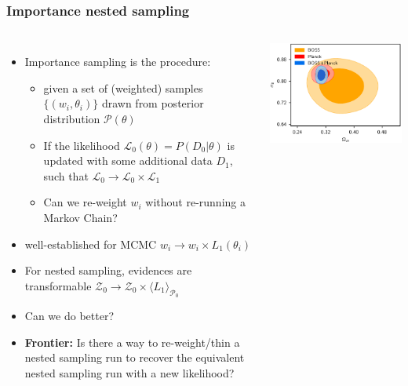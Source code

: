 \documentclass[aspectratio=169,handout]{beamer}
\begin{document}
\begin{frame}
    \frametitle{Importance nested sampling}
    \begin{columns}
    \begin{itemize}
        \item Importance sampling is the procedure:
            \begin{itemize}
                \item given a set of (weighted) samples $\{(w_i,\theta_i)\}$ drawn from posterior distribution $\mathcal{P}(\theta)$
                \item If the likelihood $\mathcal{L}_0(\theta)=P(D_0|\theta)$ is updated with some additional data $D_1$, such that $\mathcal{L}_0 \to \mathcal{L}_0\times \mathcal{L}_1$~
                \item Can we re-weight $w_i$ without re-running a Markov Chain?
            \end{itemize}
        \item well-established for MCMC $w_i \to w_i \times L_1(\theta_i)$
        \item For nested sampling, evidences are transformable $\mathcal{Z}_0\to \mathcal{Z}_0\times\langle L_1\rangle_{\mathcal{P}_0}$
        \item Can we do better?
        \item \textbf{Frontier:} Is there a way to re-weight/thin a nested sampling run to recover the equivalent nested sampling run with a new likelihood?
    \end{itemize}
    \includegraphics[width=\textwidth]{figures/importance}
    \end{columns}
\end{frame}
\end{document}
